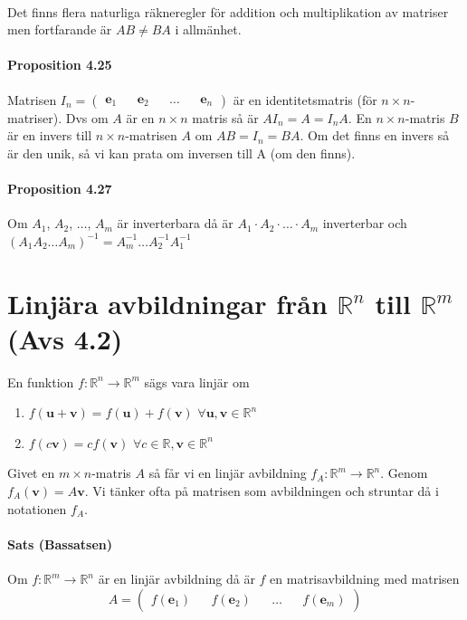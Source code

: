 ~\\

Det finns flera naturliga räkneregler för addition och multiplikation av matriser men fortfarande är $AB\neq BA$ i allmänhet.

\paragraph{Proposition 4.25} Matrisen $I_{n}=\begin{pmatrix}\bm{e}_{1}&&\bm{e}_{2}&&\ldots&&\bm{e}_{n}\end{pmatrix}$ är en identitetsmatris (för $n\times n$-matriser).
Dvs om $A$ är en $n\times n$ matris så är $AI_{n}=A=I_{n}A$.
En $n\times n$-matris $B$ är en invers till $n\times n$-matrisen $A$ om $AB=I_{n}=BA$.
Om det finns en invers så är den unik, så vi kan prata om inversen till A (om den finns).

\paragraph{Proposition 4.27} Om $A_{1}$, $A_{2}$, $\ldots $, $A_{m}$ är inverterbara då är $A_{1}\cdot A_{2}\cdot \ldots \cdot A_{m}$ inverterbar och 
$(A_{1}A_{2}\ldots A_{m})^{-1}=A_{m}^{-1}\ldots A_{2}^{-1}A_{1}^{-1}$

\section{Linjära avbildningar från $\mathbb{R}^{n}$ till $\mathbb{R}^{m}$ (Avs 4.2)}
En funktion $f:\mathbb{R}^{n}\rightarrow \mathbb{R}^{m}$ sägs vara linjär om 
\begin{enumerate}
    \item[] $f(\bm{u}+\bm{v})=f(\bm{u})+f(\bm{v})$ $\forall \bm{u},\bm{v}\in \mathbb{R}^{n}$
    \item[] $f(c\bm{v})=cf(\bm{v})$ $\forall c\in\mathbb{R},\bm{v}\in\mathbb{R}^{n}$
\end{enumerate}
Givet en $m\times n$-matris $A$ så får vi en linjär avbildning $f_{A}:\mathbb{R}^{m}\rightarrow \mathbb{R}^{n}$.
Genom $f_{A}(\bm{v})=A\bm{v}$.
Vi tänker ofta på matrisen som avbildningen och struntar då i notationen $f_{A}$.

\paragraph{Sats (Bassatsen)} Om $f:\mathbb{R}^{m}\rightarrow \mathbb{R}^{n}$ är en linjär avbildning då är $f$ en matrisavbildning med matrisen
\begin{equation*}
    A=\begin{pmatrix}
        f(\bm{e}_{1})&&f(\bm{e}_{2})&&\ldots&&f(\bm{e}_{m})
    \end{pmatrix}
\end{equation*}

